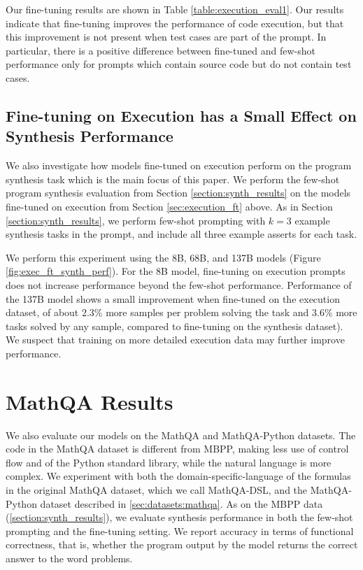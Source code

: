 Our fine-tuning results are shown in Table \ref{table:execution_eval1}.
Our results indicate that fine-tuning improves the performance of code execution, but that this improvement is not present when test cases are part of the prompt. In particular, there is a positive difference between fine-tuned and few-shot performance only for prompts which contain source code but do not contain test cases.

\subsection{Fine-tuning on Execution has a Small Effect on Synthesis Performance}

We also investigate how models fine-tuned on execution perform on the program synthesis task which is the main focus of this paper. We perform the few-shot program synthesis evaluation from Section \ref{section:synth_results} on the models fine-tuned on execution from Section \ref{sec:execution_ft} above. As in Section \ref{section:synth_results}, we perform few-shot prompting with $k=3$ example synthesis tasks in the prompt, and include all three example asserts for each task.

We perform this experiment using the 8B, 68B, and 137B models (Figure \ref{fig:exec_ft_synth_perf}).
For the 8B model, fine-tuning on execution prompts does not increase performance beyond the few-shot performance. Performance of the 137B model shows a small improvement when fine-tuned on the execution dataset, of about 2.3\% more samples per problem solving the task and 3.6\% more tasks solved by any sample, compared to fine-tuning on the synthesis dataset). We suspect that training on more detailed execution data \citep{Zaremba2014LearningTE,NEURIPS2020_Bieber} may further improve performance.

\section{MathQA Results}
\label{sec:results:mathqa}

We also evaluate our models on the MathQA and MathQA-Python datasets. The code in the MathQA dataset is different from MBPP, making less use of control flow and of the Python standard library, while the natural language is more complex. We experiment with both the domain-specific-language of the formulas in the original MathQA dataset, which we call MathQA-DSL, and the MathQA-Python dataset described in \autoref{sec:datasets:mathqa}.
As on the MBPP data (\autoref{section:synth_results}), we evaluate synthesis performance in both the few-shot prompting and the fine-tuning setting. We report accuracy in terms of functional correctness, that is, whether the program output by the model returns the correct answer to the word problems. 

